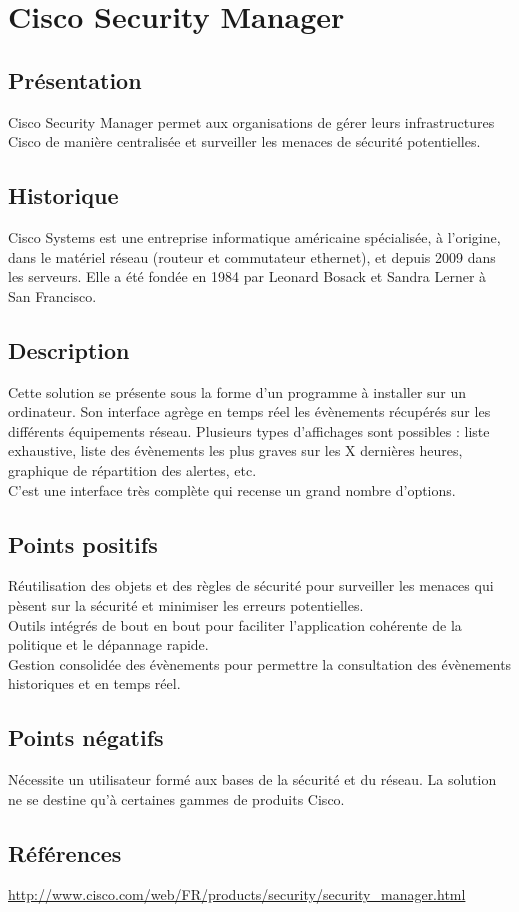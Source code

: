 \section{Cisco Security Manager}
\thispagestyle{plain}
\subsection{Présentation}
Cisco Security Manager permet aux organisations de gérer leurs infrastructures Cisco de manière centralisée et surveiller les menaces de sécurité potentielles.

\subsection{Historique}
Cisco Systems est une entreprise informatique américaine spécialisée, à l’origine, dans le matériel réseau (routeur et commutateur ethernet), et depuis 2009 dans les serveurs. Elle a été fondée en 1984 par Leonard Bosack et Sandra Lerner à San Francisco.

\subsection{Description}
Cette solution se présente sous la forme d'un programme à installer sur un ordinateur. Son interface agrège en temps réel les évènements récupérés sur les différents équipements réseau. Plusieurs types d'affichages sont possibles : liste exhaustive, liste des évènements les plus graves sur les X dernières heures, graphique de répartition des alertes, etc.\\
C'est une interface très complète qui recense un grand nombre d'options.

\subsection{Points positifs}
Réutilisation des objets et des règles de sécurité pour surveiller les menaces qui pèsent sur la sécurité et minimiser les erreurs potentielles.\\
Outils intégrés de bout en bout pour faciliter l'application cohérente de la politique et le dépannage rapide.\\
Gestion consolidée des évènements pour permettre la consultation des évènements historiques et en temps réel.\\

\subsection{Points négatifs}
Nécessite un utilisateur formé aux bases de la sécurité et du réseau.
La solution ne se destine qu’à certaines gammes de produits Cisco.

\subsection{Références}
\small
\noindent
\url{http://www.cisco.com/web/FR/products/security/security_manager.html}
\normalsize